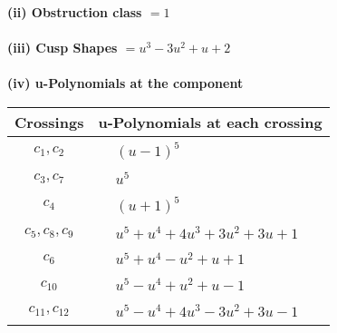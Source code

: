 \documentclass[1p]{elsarticle_modified}
\theoremstyle{definition}
\begin{document}
\flushleft \textbf{(ii) Obstruction class $= 1$}\\~\\
\flushleft \textbf{(iii) Cusp Shapes $= u^3-3 u^2+u+2$}\\~\\
\newpage\renewcommand{\arraystretch}{1}
\flushleft \textbf{(iv) u-Polynomials at the component}\newline \\
\begin{tabular}{m{50pt}|m{274pt}}
Crossings & \hspace{64pt}u-Polynomials at each crossing \\
\hline $$\begin{aligned}c_{1},c_{2}\end{aligned}$$&$\begin{aligned}
&(u-1)^5
\end{aligned}$\\
\hline $$\begin{aligned}c_{3},c_{7}\end{aligned}$$&$\begin{aligned}
&u^5
\end{aligned}$\\
\hline $$\begin{aligned}c_{4}\end{aligned}$$&$\begin{aligned}
&(u+1)^5
\end{aligned}$\\
\hline $$\begin{aligned}c_{5},c_{8},c_{9}\end{aligned}$$&$\begin{aligned}
&u^5+u^4+4 u^3+3 u^2+3 u+1
\end{aligned}$\\
\hline $$\begin{aligned}c_{6}\end{aligned}$$&$\begin{aligned}
&u^5+u^4- u^2+u+1
\end{aligned}$\\
\hline $$\begin{aligned}c_{10}\end{aligned}$$&$\begin{aligned}
&u^5- u^4+u^2+u-1
\end{aligned}$\\
\hline $$\begin{aligned}c_{11},c_{12}\end{aligned}$$&$\begin{aligned}
&u^5- u^4+4 u^3-3 u^2+3 u-1
\end{aligned}$\\
\hline
\end{tabular}\\~\\
\end{document}
